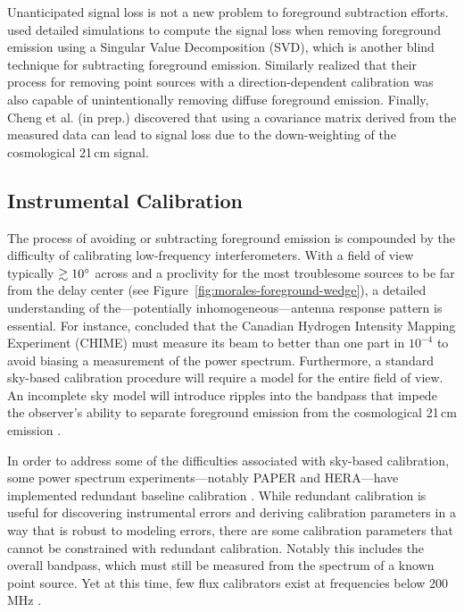 \begin{bibunit}
Unanticipated signal loss is not a new problem to foreground subtraction efforts.
\citet{2013MNRAS.433..639P} used detailed simulations to compute the signal loss when removing
foreground emission using a Singular Value Decomposition (SVD), which is another blind technique for
subtracting foreground emission. Similarly \citet{2016MNRAS.463.4317P} realized that their process
for removing point sources with a direction-dependent calibration was also capable of
unintentionally removing diffuse foreground emission. Finally, Cheng et al. (in prep.) discovered
that using a covariance matrix derived from the measured data can lead to signal loss due to the
down-weighting of the cosmological 21\,cm signal.

\subsection{Instrumental Calibration}

The process of avoiding or subtracting foreground emission is compounded by the difficulty of
calibrating low-frequency interferometers.  With a field of view typically $\gtrsim10\mbox{$^\circ$}$ across
and a proclivity for the most troublesome sources to be far from the delay center (see
Figure~\ref{fig:morales-foreground-wedge}), a detailed understanding of the---potentially
inhomogeneous---antenna response pattern is essential.  For instance, \citet{2015PhRvD..91h3514S}
concluded that the Canadian Hydrogen Intensity Mapping Experiment (CHIME) must measure its beam to
better than one part in $10^{-4}$ to avoid biasing a measurement of the power spectrum.
Furthermore, a standard sky-based calibration procedure will require a model for the entire field of
view. An incomplete sky model will introduce ripples into the bandpass that impede the observer's
ability to separate foreground emission from the cosmological 21\,cm emission \citep[e.g.,
Figure~\ref{fig:morales-foreground-wedge};][]{2016MNRAS.461.3135B, 2017MNRAS.470.1849E}.

In order to address some of the difficulties associated with sky-based calibration, some power
spectrum experiments---notably PAPER and HERA---have implemented redundant baseline calibration
\citep{2010MNRAS.408.1029L}. While redundant calibration is useful for discovering instrumental
errors and deriving calibration parameters in a way that is robust to modeling errors, there are
some calibration parameters that cannot be constrained with redundant calibration.  Notably this
includes the overall bandpass, which must still be measured from the spectrum of a known point
source. Yet at this time, few flux calibrators exist at frequencies below 200\,MHz
\citep{2012MNRAS.423L..30S, 2017ApJS..230....7P}.


\end{bibunit}
